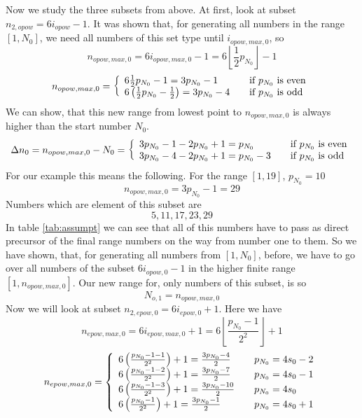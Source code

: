 \documentclass{aomart}
\theoremstyle{definition}
\begin{document}
Now we study the three subsets from above. At first, look at subset $n_{2,opow} = 6i_{opow} - 1$. It was shown that, for generating all numbers in the range $[1,N_{0}]$, we need all numbers of this set type until $i_{opow,max,0}$, so
\begin{equation}\label{eq:oddmax}
	n_{opow,max,0} = 6i_{opow,max,0} - 1 = 6 \left\lfloor \frac{1}{2} p_{N_{0}} \right\rfloor - 1 
\end{equation}
\begin{equation} n_{opow,max,0} = \left\{
	\begin{array}{l@{\quad \quad}l}
	6\frac{1}{2}p_{N_{0}}-1 = 3p_{N_{0}}-1 & \textnormal{if $p_{N_{0}}$ is even} \\
	6\left(\frac{1}{2}p_{N_{0}}-\frac{1}{2}\right) = 3p_{N_{0}}-4 & \textnormal{if $p_{N_{0}}$ is odd}
	\end{array}
\right. \label{eq:nopowmax0} \end{equation} 
We can show, that this new range from lowest point to $n_{opow,max,0}$ is always higher than the start number $N_{0}$.
\[ \Delta n_{0} = n_{opow,max,0} - N_{0} = \left\{
	\begin{array}{l@{\quad \quad}l}
	3p_{N_{0}}-1 - 2p_{N_{0}} + 1 = p_{N_{0}} & \textnormal{if $p_{N_{0}}$ is even} \\
	3p_{N_{0}}-4 - 2p_{N_{0}} + 1 = p_{N_{0}} - 3 & \textnormal{if $p_{N_{0}}$ is odd}
	\end{array}
\right. \] 
For our example this means the following. For the range $[1,19]$, $p_{N_{0}} = 10$
\[ n_{opow,max,0} = 3p_{N_{0}}-1 = 29 \]
Numbers which are element of this subset are
\[ 5, 11, 17, 23, 29 \]
In table \ref{tab:assumpt} we can see that all of this numbers have to pass as direct precursor of the final range numbers on the way from number one to them. So we have shown, that, for generating all numbers from $[1,N_{0}]$, before, we have to go over all numbers of the subset $6i_{opow,0} - 1$ in the higher finite range $[1,n_{opow,max,0}]$. Our new range for, only numbers of this subset, is so
\begin{equation}\label{eq:oddRange}
	N_{o,1} = n_{opow,max,0}
\end{equation}
Now we will look at subset $n_{2,epow,0} = 6i_{epow,0} + 1$. Here we have
\begin{equation}\label{eq:evmax}
	n_{epow,max,0} = 6i_{epow,max,0} + 1 =  6 \left\lfloor \frac{p_{N_{0}}-1}{2^{2}} \right\rfloor + 1
\end{equation}
\begin{equation} n_{epow,max,0} = \left\{
	\begin{array}{l@{\quad \quad}l}
	6\left( \frac{p_{N_{0}}-1-1}{2^{2}} \right) + 1 = \frac{3p_{N_{0}}-4}{2} & p_{N_{0}}=4s_{0}-2 \\
	6\left( \frac{p_{N_{0}}-1-2}{2^{2}} \right) + 1 = \frac{3p_{N_{0}}-7}{2} & p_{N_{0}}=4s_{0}-1 \\
	6\left( \frac{p_{N_{0}}-1-3}{2^{2}} \right) + 1 = \frac{3p_{N_{0}}-10}{2} & p_{N_{0}}=4s_{0} \\
	6\left( \frac{p_{N_{0}}-1}{2^{2}} \right) + 1 = \frac{3p_{N_{0}}-1}{2} & p_{N_{0}}=4s_{0}+1 \\	
	\end{array}
\right. \label{eq:epowmax0cases} \end{equation} 
\end{document}
